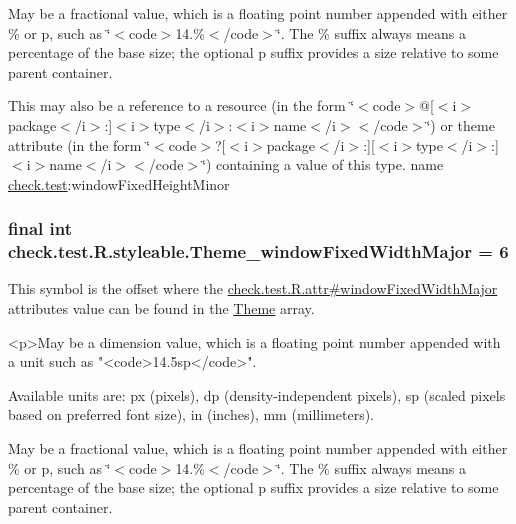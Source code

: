 May be a fractional value, which is a floating point number appended with either \% or p, such as \char`\"{}$<$code$>$14.\%$<$/code$>$\char`\"{}. The \% suffix always means a percentage of the base size; the optional p suffix provides a size relative to some parent container. 

This may also be a reference to a resource (in the form \char`\"{}$<$code$>$@\mbox{[}$<$i$>$package$<$/i$>$\+:\mbox{]}$<$i$>$type$<$/i$>$\+:$<$i$>$name$<$/i$>$$<$/code$>$\char`\"{}) or theme attribute (in the form \char`\"{}$<$code$>$?\mbox{[}$<$i$>$package$<$/i$>$\+:\mbox{]}\mbox{[}$<$i$>$type$<$/i$>$\+:\mbox{]}$<$i$>$name$<$/i$>$$<$/code$>$\char`\"{}) containing a value of this type.  name \hyperlink{namespacecheck_1_1test}{check.\+test}\+:window\+Fixed\+Height\+Minor \hypertarget{classcheck_1_1test_1_1_r_1_1styleable_aba8175a4427847a30a88e449000d7412}{}
\subsubsection[{Theme\+\_\+window\+Fixed\+Width\+Major}]{\setlength{\rightskip}{0pt plus 5cm}final int check.\+test.\+R.\+styleable.\+Theme\+\_\+window\+Fixed\+Width\+Major = 6\hspace{0.3cm}{\ttfamily [static]}}\label{classcheck_1_1test_1_1_r_1_1styleable_aba8175a4427847a30a88e449000d7412}
This symbol is the offset where the \hyperlink{classcheck_1_1test_1_1_r_1_1attr_a9cff73eb6499ce956f00b5e14b6b15fc}{check.\+test.\+R.\+attr\#window\+Fixed\+Width\+Major} attribute\textquotesingle{}s value can be found in the \hyperlink{classcheck_1_1test_1_1_r_1_1styleable_acca726d02016a0cf607782ec3a436a81}{Theme} array.

\begin{DoxyVerb}      <p>May be a dimension value, which is a floating point number appended with a unit such as "<code>14.5sp</code>".
\end{DoxyVerb}
 Available units are\+: px (pixels), dp (density-\/independent pixels), sp (scaled pixels based on preferred font size), in (inches), mm (millimeters). 

May be a fractional value, which is a floating point number appended with either \% or p, such as \char`\"{}$<$code$>$14.\%$<$/code$>$\char`\"{}. The \% suffix always means a percentage of the base size; the optional p suffix provides a size relative to some parent container. 

